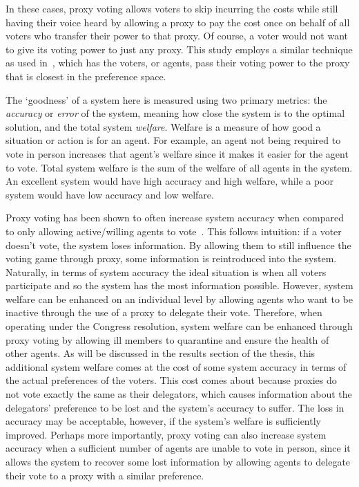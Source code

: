 In these cases, proxy voting allows voters to skip incurring the costs while still
having their voice heard by allowing a proxy to pay the cost once on behalf of all
voters who transfer their power to that proxy.
Of course, a voter would not want to give its voting power to just any proxy.
This study employs a similar technique as used in~\cite{Cohensius2017}, which has the
voters, or agents, pass their voting power to the proxy that is closest in the
preference space.

The `goodness' of a system here is measured using two primary metrics: the
\textit{accuracy} or \textit{error} of the system, meaning how close the system is to
the optimal solution, and the total system \textit{welfare}.
Welfare is a measure of how good a situation or action is for an agent.
For example, an agent not being required to vote in person increases that agent's
welfare since it makes it easier for the agent to vote.
Total system welfare is the sum of the welfare of all agents in the system.
An excellent system would have high accuracy and high welfare, while a poor system
would have low accuracy and low welfare.

Proxy voting has been shown to often increase system accuracy when compared to only
allowing active/willing agents to vote~\cite{Cohensius2017}.
This follows intuition: if a voter doesn't vote, the system loses information.
By allowing them to still influence the voting game through proxy, some information
is reintroduced into the system.
Naturally, in terms of system accuracy the ideal situation is when all voters
participate and so the system has the most information possible.
However, system welfare can be enhanced on an individual level by allowing agents
who want to be inactive through the use of a proxy to delegate their vote.
Therefore, when operating under the Congress resolution, system welfare can be
enhanced through proxy voting by allowing ill members to quarantine and ensure the
health of other agents.
As will be discussed in the results section of the thesis,
this additional system welfare comes at the cost of some system accuracy in terms of
the actual preferences of the voters.
This cost comes about because proxies do not vote exactly the same as their delegators,
which causes information about the delegators' preference to be lost and the system's
accuracy to suffer.
The loss in accuracy may be acceptable, however, if the system's welfare is sufficiently
improved.
Perhaps more importantly, proxy voting can also increase system accuracy when a
sufficient number of agents are unable to vote in person, since it allows the system
to recover some lost information by allowing agents to delegate their vote to a proxy
with a similar preference.

